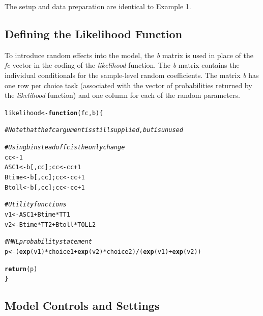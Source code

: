 \documentclass{article}\usepackage[]{graphicx}\usepackage[]{color}
\makeatletter
\newcommand{\hlnum}[1]{\textcolor[rgb]{0.686,0.059,0.569}{#1}}%
\newcommand{\hlcom}[1]{\textcolor[rgb]{0.678,0.584,0.686}{\textit{#1}}}%
\newcommand{\hlopt}[1]{\textcolor[rgb]{0,0,0}{#1}}%
\newcommand{\hlstd}[1]{\textcolor[rgb]{0.345,0.345,0.345}{#1}}%
\newcommand{\hlkwa}[1]{\textcolor[rgb]{0.161,0.373,0.58}{\textbf{#1}}}%
\newcommand{\hlkwb}[1]{\textcolor[rgb]{0.69,0.353,0.396}{#1}}%
\newcommand{\hlkwc}[1]{\textcolor[rgb]{0.333,0.667,0.333}{#1}}%
\newcommand{\hlkwd}[1]{\textcolor[rgb]{0.737,0.353,0.396}{\textbf{#1}}}%
\newenvironment{kframe}{%
 \def\at@end@of@kframe{}%
 \ifinner\ifhmode%
  \def\at@end@of@kframe{\end{minipage}}%
  \begin{minipage}{\columnwidth}%
 \fi\fi%
 \def\FrameCommand##1{\hskip\@totalleftmargin \hskip-\fboxsep
 \colorbox{shadecolor}{##1}\hskip-\fboxsep
     \hskip-\linewidth \hskip-\@totalleftmargin \hskip\columnwidth}%
 \MakeFramed {\advance\hsize-\width
   \@totalleftmargin\z@ \linewidth\hsize
   \@setminipage}}%
 {\par\unskip\endMakeFramed%
 \at@end@of@kframe}
\newenvironment{knitrout}{}{} %
\makeatother
\begin{document}
The setup and data preparation are identical to Example 1.

\subsection*{Defining the Likelihood Function}

To introduce random effects into the model, the \emph{b} matrix is used in place of the \emph{fc} vector in the coding of the \emph{likelihood} function. The \emph{b} matrix contains the individual conditionals for the sample-level random coefficients. The matrix \emph{b} has one row per choice task (associated with the vector of probabilities returned by the \emph{likelihood} function) and one column for each of the random parameters.

\begin{knitrout}
\color{fgcolor}\begin{kframe}
\begin{alltt}
\hlstd{likelihood} \hlkwb{<-} \hlkwa{function}\hlstd{(}\hlkwc{fc}\hlstd{,} \hlkwc{b}\hlstd{) \{}

     \hlcom{# Note that the fc argument is still supplied, but is unused}

     \hlcom{# Using b instead of fc is the only change}
     \hlstd{cc}     \hlkwb{<-} \hlnum{1}
     \hlstd{ASC1}   \hlkwb{<-} \hlstd{b[, cc]; cc} \hlkwb{<-} \hlstd{cc} \hlopt{+} \hlnum{1}
     \hlstd{Btime}  \hlkwb{<-} \hlstd{b[, cc]; cc} \hlkwb{<-} \hlstd{cc} \hlopt{+} \hlnum{1}
     \hlstd{Btoll}  \hlkwb{<-} \hlstd{b[, cc]; cc} \hlkwb{<-} \hlstd{cc} \hlopt{+} \hlnum{1}

     \hlcom{# Utility functions}
     \hlstd{v1} \hlkwb{<-} \hlstd{ASC1} \hlopt{+} \hlstd{Btime} \hlopt{*} \hlstd{TT1}
     \hlstd{v2} \hlkwb{<-}        \hlstd{Btime} \hlopt{*} \hlstd{TT2} \hlopt{+} \hlstd{Btoll} \hlopt{*} \hlstd{TOLL2}

     \hlcom{# MNL probability statement}
     \hlstd{p}  \hlkwb{<-} \hlstd{(}\hlkwd{exp}\hlstd{(v1)} \hlopt{*} \hlstd{choice1} \hlopt{+} \hlkwd{exp}\hlstd{(v2)} \hlopt{*} \hlstd{choice2)} \hlopt{/} \hlstd{(}\hlkwd{exp}\hlstd{(v1)} \hlopt{+} \hlkwd{exp}\hlstd{(v2))}

     \hlkwd{return}\hlstd{(p)}
\hlstd{\}}
\end{alltt}
\end{kframe}
\end{knitrout}

\subsection*{Model Controls and Settings}
\end{document}
